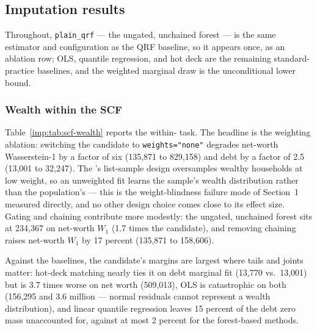 \subsection{Imputation results}
\label{imp:sec:results}


Throughout, \texttt{plain\_qrf} --- the ungated, unchained forest --- is the
same estimator and configuration as the \microimpute{} QRF baseline, so it
appears once, as an ablation row; OLS, quantile regression, and hot deck are
the remaining standard-practice baselines, and the weighted marginal draw is
the unconditional lower bound.

\subsubsection{Wealth within the SCF}
\label{imp:sec:results-scf}

\begin{table}[t]
\centering
\footnotesize
\resizebox{\textwidth}{!}{}
\caption{Wealth imputation within the \scf{} (debt and net worth from
demographics and income): weighted pinball loss, Wasserstein-1 to the weighted
donor distribution, and zero-share error, mean (sd) over ten paired seeds.
Bold marks the best non-reference value per column. Lower is better.}
\label{imp:tab:scf-wealth}
\end{table}

Table~\ref{imp:tab:scf-wealth} reports the within-\scf{} task. The headline is the
weighting ablation: switching the candidate to \texttt{weights="none"}
degrades net-worth Wasserstein-1 by a factor of six (135,871 to 829,158) and
debt by a factor of 2.5 (13,001 to 32,247). The \scf{}'s list-sample design
oversamples wealthy households at low weight, so an unweighted fit learns the
sample's wealth distribution rather than the population's --- this is the
weight-blindness failure mode of Section~1 measured directly, and no other
design choice comes close to its effect size. Gating and chaining contribute
more modestly: the ungated, unchained forest sits at 234,367 on net-worth
$W_1$ (1.7 times the candidate), and removing chaining raises net-worth
$W_1$ by 17 percent (135,871 to 158,606).

Against the baselines, the candidate's margins are largest where tails and
joints matter: hot-deck matching nearly ties it on debt marginal fit (13,770
vs.\ 13,001) but is 3.7 times worse on net worth (509,013), OLS is
catastrophic on both (156,295 and 3.6 million --- normal residuals cannot
represent a wealth distribution), and linear quantile regression leaves 15
percent of the debt zero mass unaccounted for, against at most 2 percent for
the forest-based methods.

